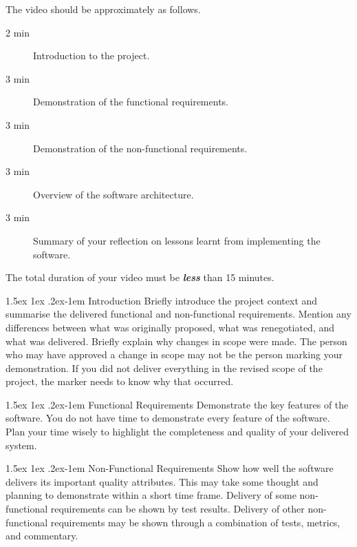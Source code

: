 \documentclass{csse4400}
\makeatletter
\renewcommand{\paragraph}{%
  \@startsection{paragraph}{4}%
  {\z@}{1.5ex \@plus 1ex \@minus .2ex}{-1em}%
  {\normalfont\normalsize\bfseries}%
}
\makeatother
\begin{document}
\begin{samepage}
The video  should be approximately as follows.

\begin{description}
    \item[2 min] Introduction to the project.
    \item[3 min] Demonstration of the functional requirements.
    \item[3 min] Demonstration of the non-functional requirements.
    \item[3 min] Overview of the software architecture.
    \item[3 min] Summary of your reflection on lessons learnt from implementing the software.
\end{description}
\end{samepage}

\noindent
The total duration of your video must be \textbf{\emph{less}} than 15 minutes.

\paragraph{Introduction} Briefly introduce the project context and summarise the delivered functional and non-functional requirements.
Mention any differences between what was originally proposed, what was renegotiated, and what was delivered.
Briefly explain why changes in scope were made.
The person who may have approved a change in scope may not be the person marking your demonstration.
If you did not deliver everything in the revised scope of the project, the marker needs to know why that occurred.

\paragraph{Functional Requirements} Demonstrate the key features of the software.
You do not have time to demonstrate every feature of the software.
Plan your time wisely to highlight the completeness and quality of your delivered system.

\paragraph{Non-Functional Requirements} Show how well the software delivers its important quality attributes.
This may take some thought and planning to demonstrate within a short time frame.
Delivery of some non-functional requirements can be shown by test results.
Delivery of other non-functional requirements may be shown through a combination of tests, metrics, and commentary.
\end{document}
